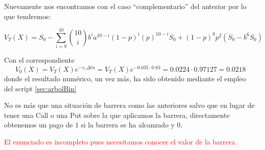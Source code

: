 \begin{problem}[2]
\spart

Nuevamente nos encontramos con el caso ``complementario'' del anterior por lo que tendremos:

\[V_T(X) = S_0 -\sum_{i=9}^{10}{10 \choose i}b^{i}a^{10-i}(1-p)^i(p)^{10-i}S_0+(1-p)^8p^2(S_0-b^6S_0)\]

Con el correspondiente
\[V_0(X)=V_T(X)e^{-r_cΔtn}=V_T(X)e^{-0.035\cdot 0.83} = 0.0224 \cdot 0.97127 = 0.0218\]
donde el resultado numérico, un vez más, ha sido obtenido mediante el empleo del script \ref{sec:arbolBin}

\spart

No es más que una situación de barrera como las anteriores salvo que en lugar de tener una Call o una Put sobre la que aplicamos la barrera, directamente obtenemos un pago de $1$ si la barrera se ha alcanzado y $0$.

\textcolor{red}{El enunciado es incompleto pues necesitamos conocer el valor de la barrera.}

\end{problem}

